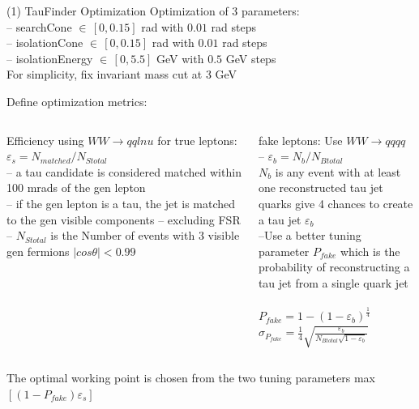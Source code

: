 \documentclass[10pt]{beamer}
\begin{document}
\begin{frame}{(1) TauFinder Optimization}
Optimization of 3 parameters:\\
-- searchCone $\in \, [0,0.15] $ rad with $0.01 $ rad steps\\
-- isolationCone $\in \, [0,0.15] $ rad with $0.01 $ rad steps\\
-- isolationEnergy $\in \, [0,5.5] $ GeV with $0.5 $ GeV steps \\

For simplicity, fix invariant mass cut at 3 GeV

Define optimization metrics:\\
\begin{columns}
\begin{column}{0.5\textwidth}
Efficiency using $WW\rightarrow qq l nu$ for
true leptons:\\
$\varepsilon_s = N_{matched}/N_{Stotal} $\\
	\scriptsize
	\quad -- a tau candidate is considered matched within 100 mrads of the gen lepton\\ 
	\quad -- if the gen lepton is a tau, the jet is matched to the gen visible components -- excluding FSR
	\quad -- $N_{Stotal}$ is the Number of events with 3 visible gen fermions $|cos\theta |< 0.99$
\end{column}
\begin{column}{0.5\textwidth}
fake leptons:
Use $WW \rightarrow qqqq$ \\
-- $\varepsilon_b = N_b/N_{Btotal}$ \\
	\scriptsize
	$N_b$ is any event with at least one reconstructed tau jet
\quad \quad \\

 quarks give 4 chances to create a tau jet $\varepsilon_b$\\
--Use a better tuning parameter $P_{fake}$ which is the probability of reconstructing a tau jet from a single quark jet\\
\quad \quad \\
$P_{fake} = 1-(1 - \varepsilon_b)^{\frac{1}{4} }$\\
$\sigma_{P_{fake}} = \frac{1}{4} \sqrt{\frac{\varepsilon_b}{N_{Btotal} \sqrt{1-\varepsilon_b}} }$

\end{column}
\end{columns}

The optimal working point is chosen from the two tuning parameters max$[(1-P_{fake}) \varepsilon_s]$
\end{frame}
\end{document}
